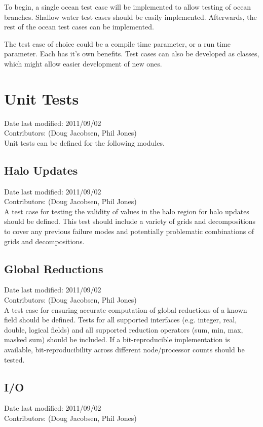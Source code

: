 \documentclass[11pt]{report}
\begin{document}
To begin, a single ocean test case will be implemented to allow testing of ocean branches. Shallow water test cases should be easily implemented. Afterwards, the rest of the ocean test cases can be implemented.

The test case of choice could be a compile time parameter, or a run time parameter. Each has it's own benefits. Test cases can also be developed as classes, which might allow easier development of new ones.

\section{Unit Tests}
Date last modified: 2011/09/02 \\
Contributors: (Doug Jacobsen, Phil Jones) \\

Unit tests can be defined for the following modules.

\subsection{Halo Updates}
Date last modified: 2011/09/02 \\
Contributors: (Doug Jacobsen, Phil Jones) \\

A test case for testing the validity of values in the halo region for halo updates should be defined.  This test should include a variety of grids and
decompositions to cover any previous failure modes and potentially problematic 
combinations of grids and decompositions.

\subsection{Global Reductions}
Date last modified: 2011/09/02 \\
Contributors: (Doug Jacobsen, Phil Jones) \\

A test case for ensuring accurate computation of global reductions of a 
known field should be defined. Tests for all supported interfaces 
(e.g. integer, real, double, logical fields) and all supported reduction
operators (sum, min, max, masked sum) should be included.  If a 
bit-reproducible implementation is available, bit-reproducibility across
different node/processor counts should be tested.

\subsection{I/O}
Date last modified: 2011/09/02 \\
Contributors: (Doug Jacobsen, Phil Jones) \\
\end{document}
